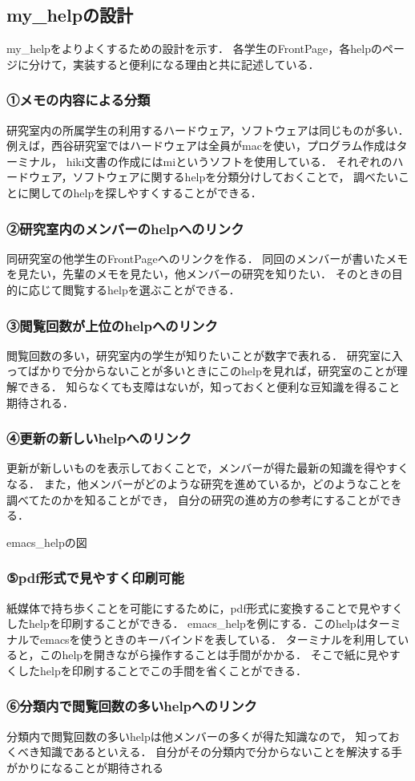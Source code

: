\subsection{my\_helpの設計}
my\_helpをよりよくするための設計を示す．
各学生のFrontPage，各helpのページに分けて，実装すると便利になる理由と共に記述している．

\subsubsection{①メモの内容による分類}
研究室内の所属学生の利用するハードウェア，ソフトウェアは同じものが多い．
例えば，西谷研究室ではハードウェアは全員がmacを使い，プログラム作成はターミナル，
hiki文書の作成にはmiというソフトを使用している．
それぞれのハードウェア，ソフトウェアに関するhelpを分類分けしておくことで，
調べたいことに関してのhelpを探しやすくすることができる．

\subsubsection{②研究室内のメンバーのhelpへのリンク}
同研究室の他学生のFrontPageへのリンクを作る．
同回のメンバーが書いたメモを見たい，先輩のメモを見たい，他メンバーの研究を知りたい．
そのときの目的に応じて閲覧するhelpを選ぶことができる．

\subsubsection{③閲覧回数が上位のhelpへのリンク}
閲覧回数の多い，研究室内の学生が知りたいことが数字で表れる．
研究室に入ってばかりで分からないことが多いときにこのhelpを見れば，研究室のことが理解できる．
知らなくても支障はないが，知っておくと便利な豆知識を得ること期待される．

\subsubsection{④更新の新しいhelpへのリンク}
更新が新しいものを表示しておくことで，メンバーが得た最新の知識を得やすくなる．
また，他メンバーがどのような研究を進めているか，どのようなことを調べてたのかを知ることができ，
自分の研究の進め方の参考にすることができる．

emacs\_helpの図

\subsubsection{⑤pdf形式で見やすく印刷可能}
紙媒体で持ち歩くことを可能にするために，pdf形式に変換することで見やすくしたhelpを印刷することができる．
emacs\_helpを例にする．このhelpはターミナルでemacsを使うときのキーバインドを表している．
ターミナルを利用していると，このhelpを開きながら操作することは手間がかかる．
そこで紙に見やすくしたhelpを印刷することでこの手間を省くことができる．

\subsubsection{⑥分類内で閲覧回数の多いhelpへのリンク}
分類内で閲覧回数の多いhelpは他メンバーの多くが得た知識なので，
知っておくべき知識であるといえる．
自分がその分類内で分からないことを解決する手がかりになることが期待される

